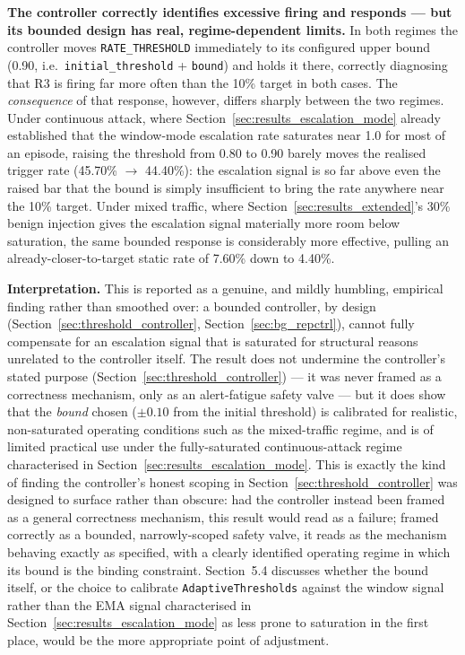 \textbf{The controller correctly identifies excessive firing and responds —
but its bounded design has real, regime-dependent limits.} In both regimes
the controller moves \texttt{RATE\_THRESHOLD} immediately to its configured
upper bound (0.90, i.e.\ \texttt{initial\_threshold} + \texttt{bound}) and
holds it there, correctly diagnosing that R3 is firing far more often than
the 10\% target in both cases. The \emph{consequence} of that response,
however, differs sharply between the two regimes. Under continuous attack,
where Section~\ref{sec:results_escalation_mode} already established that
the window-mode escalation rate saturates near 1.0 for most of an episode,
raising the threshold from 0.80 to 0.90 barely moves the realised trigger
rate (45.70\% $\to$ 44.40\%): the escalation signal is so far above even
the raised bar that the bound is simply insufficient to bring the rate
anywhere near the 10\% target. Under mixed traffic, where
Section~\ref{sec:results_extended}'s 30\% benign injection gives the
escalation signal materially more room below saturation, the same bounded
response is considerably more effective, pulling an already-closer-to-target
static rate of 7.60\% down to 4.40\%.

\textbf{Interpretation.} This is reported as a genuine, and mildly
humbling, empirical finding rather than smoothed over: a bounded
controller, by design (Section~\ref{sec:threshold_controller},
Section~\ref{sec:bg_repctrl}), cannot fully compensate for an escalation
signal that is saturated for structural reasons unrelated to the
controller itself. The result does not undermine the controller's stated
purpose (Section~\ref{sec:threshold_controller}) — it was never framed as a
correctness mechanism, only as an alert-fatigue safety valve — but it does
show that the \emph{bound} chosen ($\pm 0.10$ from the initial threshold)
is calibrated for realistic, non-saturated operating conditions such as the
mixed-traffic regime, and is of limited practical use under the
fully-saturated continuous-attack regime characterised in
Section~\ref{sec:results_escalation_mode}. This is exactly the kind of
finding the controller's honest scoping in
Section~\ref{sec:threshold_controller} was designed to surface rather than
obscure: had the controller instead been framed as a general correctness
mechanism, this result would read as a failure; framed correctly as a
bounded, narrowly-scoped safety valve, it reads as the mechanism behaving
exactly as specified, with a clearly identified operating regime in which
its bound is the binding constraint. Section~5.4 discusses whether the
bound itself, or the choice to calibrate \texttt{AdaptiveThresholds}
against the window signal rather than the EMA signal characterised in
Section~\ref{sec:results_escalation_mode} as less prone to saturation in
the first place, would be the more appropriate point of adjustment.

